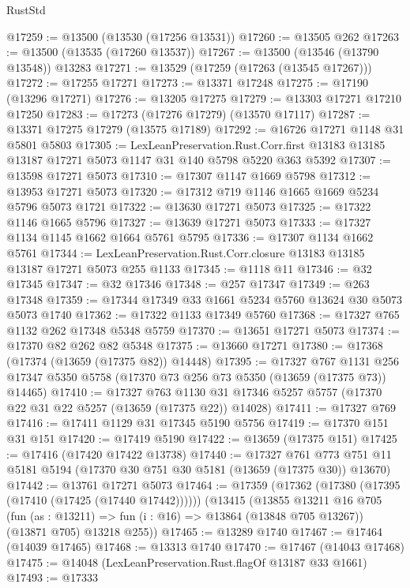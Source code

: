 \begin{lexlean}{RustStd}
\begin{coremodule}
@17259 := @13500 (@13530 (@17256 @13531))
@17260 := @13505 @262
@17263 := @13500 (@13535 (@17260 @13537))
@17267 := @13500 (@13546 (@13790 @13548)) @13283
@17271 := @13529 (@17259 (@17263 (@13545 @17267)))
@17272 := @17255 @17271
@17273 := @13371 @17248
@17275 := @17190 (@13296 @17271)
@17276 := @13205 @17275
@17279 := @13303 @17271 @17210 @17250
@17283 := @17273 (@17276 @17279) (@13570 @17117)
@17287 := @13371 @17275 @17279 (@13575 @17189)
@17292 := @16726 @17271 @1148 @31 @5801 @5803
@17305 := LexLeanPreservation.Rust.Corr.first
    @13183
    @13185
    @13187
    @17271
    @5073
    @1147
    @31
    @140
    @5798
    @5220
    @363
    @5392
@17307 := @13598 @17271 @5073
@17310 := @17307 @1147 @1669 @5798
@17312 := @13953 @17271 @5073
@17320 := @17312 @719 @1146 @1665 @1669 @5234 @5796 @5073 @1721
@17322 := @13630 @17271 @5073
@17325 := @17322 @1146 @1665 @5796
@17327 := @13639 @17271 @5073
@17333 := @17327 @1134 @1145 @1662 @1664 @5761 @5795
@17336 := @17307 @1134 @1662 @5761
@17344 := LexLeanPreservation.Rust.Corr.closure @13183 @13185 @13187 @17271 @5073 @255 @1133
@17345 := @1118 @11
@17346 := @32 @17345
@17347 := @32 @17346
@17348 := @257 @17347
@17349 := @263 @17348
@17359 := @17344 @17349 @33 @1661 @5234 @5760 @13624 @30 @5073 @5073 @1740
@17362 := @17322 @1133 @17349 @5760
@17368 := @17327 @765 @1132 @262 @17348 @5348 @5759
@17370 := @13651 @17271 @5073
@17374 := @17370 @82 @262 @82 @5348
@17375 := @13660 @17271
@17380 := @17368 (@17374 (@13659 (@17375 @82)) @14448)
@17395 := @17327
    @767
    @1131
    @256
    @17347
    @5350
    @5758
    (@17370 @73 @256 @73 @5350 (@13659 (@17375 @73)) @14465)
@17410 := @17327
    @763
    @1130
    @31
    @17346
    @5257
    @5757
    (@17370 @22 @31 @22 @5257 (@13659 (@17375 @22)) @14028)
@17411 := @17327 @769
@17416 := @17411 @1129 @31 @17345 @5190 @5756
@17419 := @17370 @151 @31 @151
@17420 := @17419 @5190
@17422 := @13659 (@17375 @151)
@17425 := @17416 (@17420 @17422 @13738)
@17440 := @17327
    @761
    @773
    @751
    @11
    @5181
    @5194
    (@17370 @30 @751 @30 @5181 (@13659 (@17375 @30)) @13670)
@17442 := @13761 @17271 @5073
@17464 := @17359
    (@17362 (@17380 (@17395 (@17410 (@17425 (@17440 @17442))))))
    (@13415
      (@13855
        @13211
        @16
        @705
        (fun (as : @13211) => fun (i : @16) => @13864 (@13848 @705 @13267))
        (@13871 @705)
        @13218
        @255))
@17465 := @13289 @1740
@17467 := @17464 (@14039 @17465)
@17468 := @13313 @1740
@17470 := @17467 (@14043 @17468)
@17475 := @14048 (LexLeanPreservation.Rust.flagOf @13187 @33 @1661)
@17493 := @17333

\end{coremodule}
\end{lexlean}
